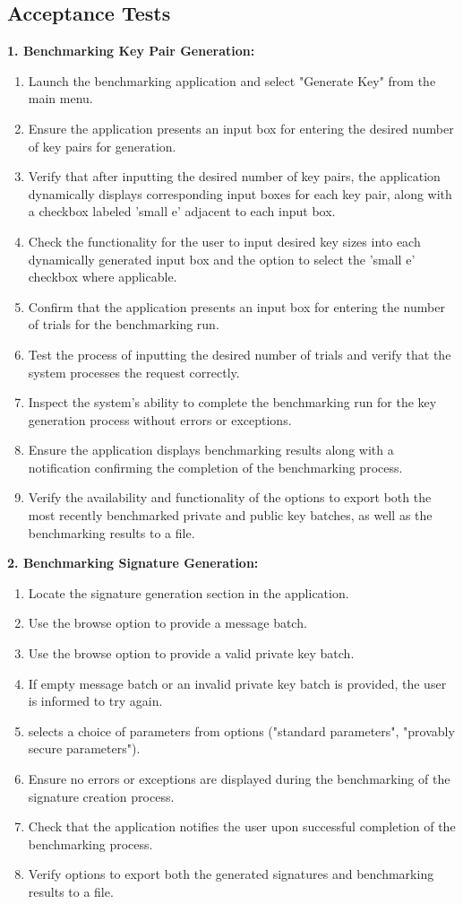 \documentclass[]{final_report}
\theoremstyle{definition}
\begin{document}
\subsection{Acceptance Tests}


\textbf{1. Benchmarking Key Pair Generation:}
\begin{enumerate}
\item Launch the benchmarking application and select "Generate Key" from the main menu.
\item Ensure the application presents an input box for entering the desired number of key pairs for generation.
\item Verify that after inputting the desired number of key pairs, the application dynamically displays corresponding input boxes for each key pair, along with a checkbox labeled 'small e' adjacent to each input box.
\item Check the functionality for the user to input desired key sizes into each dynamically generated input box and the option to select the 'small e' checkbox where applicable.
\item Confirm that the application presents an input box for entering the number of trials for the benchmarking run.
\item Test the process of inputting the desired number of trials and verify that the system processes the request correctly.
\item Inspect the system's ability to complete the benchmarking run for the key generation process without errors or exceptions.
\item Ensure the application displays benchmarking results along with a notification confirming the completion of the benchmarking process.
\item Verify the availability and functionality of the options to export both the most recently benchmarked private and public key batches, as well as the benchmarking results to a file.
\end{enumerate}


\textbf{2. Benchmarking Signature Generation:}
\begin{enumerate}
\item Locate the signature generation section in the application.
\item Use the browse option to provide a message batch.
\item Use the browse option to provide a valid private key batch.
\item If empty message batch or an invalid private key batch is provided, the user is informed to try again. 
\item selects a choice of parameters from options ("standard parameters", "provably secure parameters").
\item Ensure no errors or exceptions are displayed during the benchmarking of the signature creation process.
\item Check that the application notifies the user upon successful completion of the benchmarking process.
\item Verify options to export both the generated signatures and benchmarking results to a file.
\end{enumerate}
\end{document}
